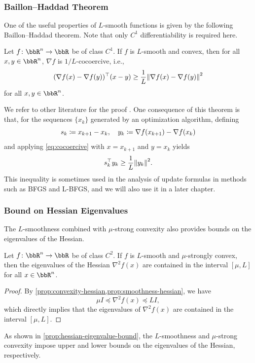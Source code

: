 \documentclass[en]{subfiles}
\begin{document}
\subsubsection{Baillon--Haddad Theorem}

One of the useful properties of $L$-smooth functions is given by the following Baillon--Haddad theorem.
Note that only $C^1$ differentiability is required here.
\begin{proposition}\label{prop:baillon_haddad}
    Let $f \colon \bbR^n \to \bbR$ be of class $C^1$. If $f$ is $L$-smooth and convex, then for all $x,y \in \bbR^n$, $\nabla f$ is $1/L$-cocoercive, i.e.,
    \begin{equation}\label{eq:cocoercive}
        (\nabla f(x)-\nabla f(y))^\top (x-y) \ge \frac{1}{L} \norm{\nabla f(x)-\nabla f(y)}^2
    \end{equation}
    for all $x,y \in \bbR^n$.
\end{proposition}
We refer to other literature for the proof \citep{bauschkeBaillonHaddadTheoremRevisited2009} \citep[Proposition 12.60]{rockafellarVariationalAnalysis1998}.
One consequence of this theorem is that, for the sequences $\{x_k\}$ generated by an optimization algorithm, defining
\begin{equation*}
    s_k \coloneqq x_{k+1}-x_k, \quad y_k \coloneqq \nabla f(x_{k+1}) - \nabla f(x_k)
\end{equation*}
and applying \cref{eq:cocoercive} with $x=x_{k+1}$ and $y=x_k$ yields
\begin{equation*}
    s_k^\top y_k \ge \frac{1}{L} \norm{y_k}^2.
\end{equation*}
This inequality is sometimes used in the analysis of update formulas in methods such as BFGS and L-BFGS, and we will also use it in a later chapter.

\subsubsection{Bound on Hessian Eigenvalues}

The $L$-smoothness combined with $\mu$-strong convexity also provides bounds on the eigenvalues of the Hessian.
\begin{proposition}\label{prop:hessian-eigenvalue-bound}
    Let $f \colon \bbR^n \to \bbR$ be of class $C^2$.
    If $f$ is $L$-smooth and $\mu$-strongly convex, then the eigenvalues of the Hessian $\nabla^2 f(x)$ are contained in the interval $[\mu, L]$ for all $x \in \bbR^n$.
\end{proposition}
\begin{proof}
    By \cref{prop:convexity-hessian,prop:smoothness-hessian}, we have
    \begin{equation*}
        \mu I \preceq \nabla^2 f(x) \preceq L I,
    \end{equation*}
    which directly implies that the eigenvalues of $\nabla^2 f(x)$ are contained in the interval $[\mu, L]$.
\end{proof}
As shown in \cref{prop:hessian-eigenvalue-bound},  the $L$-smoothness and $\mu$-strong convexity impose upper and lower bounds on the eigenvalues of the Hessian, respectively.

\ifSubfilesClassLoaded{
    
    
}{}
\end{document}
